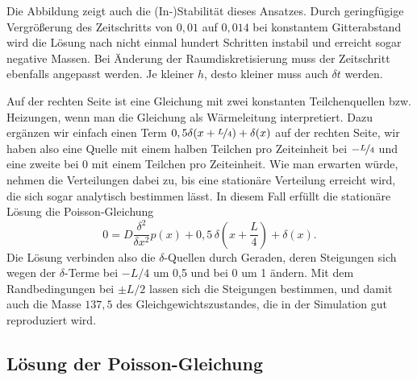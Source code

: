 %

Die Abbildung zeigt auch die (In-)Stabilität dieses Ansatzes. Durch
geringfügige Vergrößerung des Zeitschritts von $0,01$ auf $0,014$ bei
konstantem Gitterabstand wird die Lösung nach nicht einmal hundert
Schritten instabil und erreicht sogar negative Massen. Bei Änderung
der Raumdiskretisierung muss der Zeitschritt ebenfalls angepasst
werden. Je kleiner $h$, desto kleiner muss auch $\delta t$
werden.

Auf der rechten Seite ist eine Gleichung mit zwei konstanten
Teilchenquellen bzw. Heizungen, wenn man die Gleichung als
Wärmeleitung interpretiert. Dazu ergänzen wir einfach einen Term
$0,5\delta(x+\nicefrac{L}{4}) + \delta(x)$ auf der rechten Seite, wir
haben also eine Quelle mit einem halben Teilchen pro Zeiteinheit bei
$-\nicefrac{L}{4}$ und eine zweite bei $0$ mit einem Teilchen pro
Zeiteinheit. Wie man erwarten würde, nehmen die Verteilungen dabei zu,
bis eine stationäre Verteilung erreicht wird, die sich sogar
analytisch bestimmen lässt. In diesem Fall erfüllt die stationäre
Lösung die Poisson-Gleichung
\begin{equation}
  0 = D\frac{\delta^2}{\delta x^2} p(x) +
  0,5\,\delta\left(x+\frac{L}{4}\right) + \delta(x).
\end{equation}
Die Lösung verbinden also die $\delta$-Quellen durch Geraden, deren
Steigungen sich wegen der $\delta$-Terme bei $-L/4$ um 0,5 und bei 0
um 1 ändern. Mit dem Randbedingungen bei $\pm L/2$ lassen sich die
Steigungen bestimmen, und damit auch die Masse $137,5$ des
Gleichgewichtszustandes, die in der Simulation gut reproduziert wird.

\subsection{Lösung der Poisson-Gleichung}

